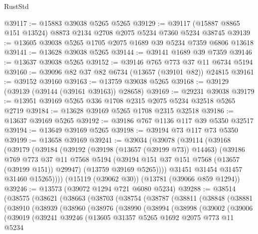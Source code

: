 \begin{lexlean}{RustStd}
\begin{coremodule}
@39117 := @15883 @39038 @5265 @5265
@39129 := @39117 (@15887 @8865 @151 @13524) @8873 @2134 @2708 @2075 @5234 @7360 @5234 @38745
@39139 := @13605 @39038 @5265 @1705 @2075 @1689 @39 @5234 @7359 @6806 @13618
@39141 := @13628 @39038 @5265
@39144 := @39141 @1689 @39 @7359
@39146 := @13637 @39038 @5265
@39152 := @39146 @765 @773 @37 @11 @6734 @5194
@39160 := @39096 @82 @37 @82 @6734 (@13657 (@39101 @82)) @24815
@39161 := @39152 @39160
@39163 := @13759 @39038 @5265
@39168 := @39129 (@39139 (@39144 (@39161 @39163)) @28658)
@39169 := @29231 @39038
@39179 := @13951 @39169 @5265 @336 @1708 @2315 @2075 @5234 @32518 @5265 @2719
@39184 := @13628 @39169 @5265 @1708 @2315 @32518
@39186 := @13637 @39169 @5265
@39192 := @39186 @767 @1136 @117 @39 @5350 @32517
@39194 := @13649 @39169 @5265
@39198 := @39194 @73 @117 @73 @5350
@39199 := @13658 @39169
@39241 := @39034
    (@39078
      (@39114
        (@39168
          (@39179
            (@39184
              (@39192
                (@39198 (@13657 (@39199 @73)) @14463)
                (@39186
                  @769
                  @773
                  @37
                  @11
                  @7568
                  @5194
                  (@39194 @151 @37 @151 @7568 (@13657 (@39199 @151)) @29947)
                  (@13759 @39169 @5265))))
            @31451
            @31454
            @31457
            @31460
            @15265))))
    (@15119 (@39062 @30))
    (@13781 (@39066 @859 @1294))
@39246 := @13573 (@39072 @1294 @721 @6080 @5234)
@39288 := @38514
    (@38575
      (@38621
        (@38663
          (@38703
            (@38754
              (@38787
                (@38811
                  (@38848
                    (@38881
                      (@38910
                        (@38939
                          (@38960
                            (@38976
                              (@38990
                                (@38994
                                  (@38998
                                    (@39002
                                      (@39006
                                        (@39019
                                          (@39241
                                            @39246
                                            (@13605
                                              @31357
                                              @5265
                                              @1692
                                              @2075
                                              @773
                                              @11
                                              @5234

\end{coremodule}
\end{lexlean}
